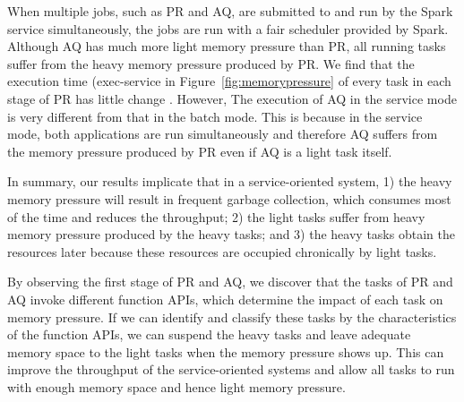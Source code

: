 When multiple jobs, such as PR and AQ, are submitted to and run by the Spark service simultaneously, the jobs are run with a fair scheduler provided by Spark. Although AQ has much more light memory pressure than PR, all running tasks suffer from the heavy memory pressure produced by PR. We find that the execution time (exec-service in Figure~\ref{fig:memorypressure} of every task in each stage of PR has little change
. However, The execution of AQ in the service mode is very different from that in the batch mode. This is because in the service mode, both applications are run simultaneously and therefore AQ suffers from the memory pressure produced by PR even if AQ is a light task itself. 

In summary, our results implicate that in a service-oriented system, 1) the heavy memory pressure will result in frequent garbage collection, which consumes most of the time and reduces the throughput; 2) the light tasks suffer from heavy memory pressure produced by the heavy tasks; and 3) the heavy tasks obtain the resources later because these resources are occupied chronically by light tasks.

By observing the first stage of PR and AQ, we discover that the tasks of PR and AQ invoke different function APIs, which determine the impact of each task on memory pressure. If we can identify and classify these tasks by the characteristics of the function APIs, we can suspend the heavy tasks and leave adequate memory space to the light tasks when the memory pressure shows up. This can improve the throughput of the service-oriented systems and allow all tasks to run with enough memory space and hence light memory pressure. 
  
